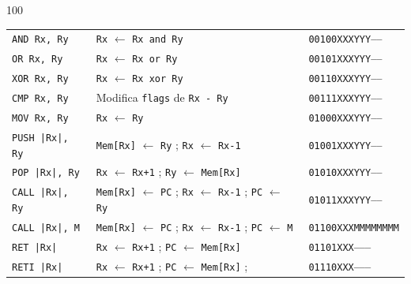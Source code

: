 \documentclass[aspectratio=169]{beamer}
\begin{document}
\begin{frame}[fragile,t]
\begin{textblock}{100}
\begin{tabular}{l|l|l}
    \texttt{AND  Rx, Ry}   & \texttt{Rx} $\leftarrow$ \texttt{Rx and Ry}                        & \texttt{\textcolor{r}{00100}\textcolor{v}{XXX}\textcolor{verde}{YYY}\textcolor{gray}{-----}} \\  %
    \texttt{OR   Rx, Ry}   & \texttt{Rx} $\leftarrow$ \texttt{Rx or Ry}                         & \texttt{\textcolor{r}{00101}\textcolor{v}{XXX}\textcolor{verde}{YYY}\textcolor{gray}{-----}} \\  %
    \texttt{XOR  Rx, Ry}   & \texttt{Rx} $\leftarrow$ \texttt{Rx xor Ry}                        & \texttt{\textcolor{r}{00110}\textcolor{v}{XXX}\textcolor{verde}{YYY}\textcolor{gray}{-----}} \\  %
    \texttt{CMP  Rx, Ry}   & Modifica \texttt{flags} de \texttt{Rx - Ry}                        & \texttt{\textcolor{r}{00111}\textcolor{v}{XXX}\textcolor{verde}{YYY}\textcolor{gray}{-----}} \\  %
    \texttt{MOV  Rx, Ry}   & \texttt{Rx} $\leftarrow$ \texttt{Ry}                               & \texttt{\textcolor{r}{01000}\textcolor{v}{XXX}\textcolor{verde}{YYY}\textcolor{gray}{-----}} \\  %
    \hline
    \texttt{PUSH |Rx|, Ry} & \texttt{Mem[Rx]} $\leftarrow$ \texttt{Ry} ; \texttt{Rx} $\leftarrow$ \texttt{Rx-1}  & \texttt{\textcolor{r}{01001}\textcolor{v}{XXX}\textcolor{verde}{YYY}\textcolor{gray}{-----}} \\  %
    \texttt{POP  |Rx|, Ry} & \texttt{Rx} $\leftarrow$ \texttt{Rx+1} ; \texttt{Ry} $\leftarrow$ \texttt{Mem[Rx]}  & \texttt{\textcolor{r}{01010}\textcolor{v}{XXX}\textcolor{verde}{YYY}\textcolor{gray}{-----}} \\  %
    \texttt{CALL |Rx|, Ry} & \texttt{Mem[Rx]} $\leftarrow$ \texttt{PC} ; \texttt{Rx} $\leftarrow$ \texttt{Rx-1} ; \texttt{PC} $\leftarrow$ \texttt{Ry}  & \texttt{\textcolor{r}{01011}\textcolor{v}{XXX}\textcolor{verde}{YYY}\textcolor{gray}{-----}} \\  %
    \texttt{CALL |Rx|, M}  & \texttt{Mem[Rx]} $\leftarrow$ \texttt{PC} ; \texttt{Rx} $\leftarrow$ \texttt{Rx-1} ; \texttt{PC} $\leftarrow$ \texttt{M}   & \texttt{\textcolor{r}{01100}\textcolor{v}{XXX}\textcolor{a}{MMMMMMMM}} \\  %
    \texttt{RET  |Rx|}     & \texttt{Rx} $\leftarrow$ \texttt{Rx+1} ; \texttt{PC} $\leftarrow$ \texttt{Mem[Rx]}  & \texttt{\textcolor{r}{01101}\textcolor{v}{XXX}\textcolor{gray}{--------}} \\  %
    \hline
    \texttt{RETI |Rx|}     & \texttt{Rx} $\leftarrow$ \texttt{Rx+1} ; \texttt{PC} $\leftarrow$ \texttt{Mem[Rx]} ;  & \texttt{\textcolor{r}{01110}\textcolor{v}{XXX}\textcolor{gray}{--------}} \\  %

\end{tabular}
\end{textblock}
\end{frame}
\end{document}
